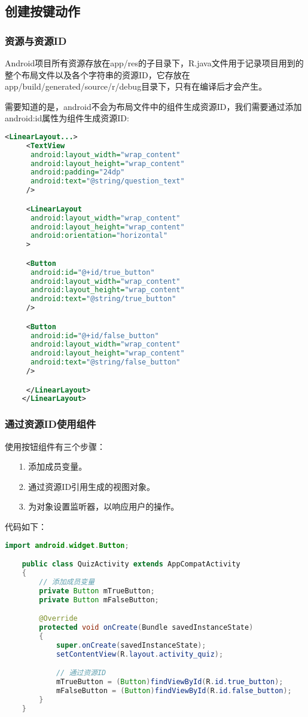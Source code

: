 \documentclass[a4paper,left=2.5cm,right=2.5cm,11pt]{article}
\begin{document}
\subsection{创建按键动作}
\subsubsection{资源与资源ID}
	Android项目所有资源存放在app/res的子目录下，R.java文件用于记录项目用到的整个布局文件以及各个字符串的资源ID，它存放在app/build/generated/source/r/debug目录下，只有在编译后才会产生。\par

	需要知道的是，android不会为布局文件中的组件生成资源ID，我们需要通过添加android:id属性为组件生成资源ID:
	\begin{lstlisting}[language = xml]
	<LinearLayout...>
	 <TextView
	  android:layout_width="wrap_content"
	  android:layout_height="wrap_content"
	  android:padding="24dp"
	  android:text="@string/question_text"
	 />

	 <LinearLayout
	  android:layout_width="wrap_content"
	  android:layout_height="wrap_content"
	  android:orientation="horizontal"
	 >

	 <Button
	  android:id="@+id/true_button"
	  android:layout_width="wrap_content"
	  android:layout_height="wrap_content"
	  android:text="@string/true_button"
	 />

	 <Button
	  android:id="@+id/false_button"
	  android:layout_width="wrap_content"
	  android:layout_height="wrap_content"
	  android:text="@string/false_button"
	 />

	 </LinearLayout>
	</LinearLayout>
	\end{lstlisting}

\subsubsection{通过资源ID使用组件}
	使用按钮组件有三个步骤：
	\begin{itemize}
		\item[1.] 添加成员变量。
		\item[2.] 通过资源ID引用生成的视图对象。
		\item[3.] 为对象设置监听器，以响应用户的操作。
	\end{itemize}

	代码如下：
	\begin{lstlisting}[language = java]
	import android.widget.Button;

	public class QuizActivity extends AppCompatActivity
	{
		// 添加成员变量
		private Button mTrueButton;
		private Button mFalseButton;

		@Override
		protected void onCreate(Bundle savedInstanceState)
		{
			super.onCreate(savedInstanceState);
			setContentView(R.layout.activity_quiz);

			// 通过资源ID
			mTrueButton = (Button)findViewById(R.id.true_button);
			mFalseButton = (Button)findViewById(R.id.false_button);
		}
	}
	\end{lstlisting}
\end{document}
